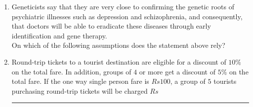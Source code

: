 \documentclass[journal]{IEEEtran}
\begin{document}
\begin{enumerate}
\begin{enumerate}
\end{enumerate}
\item Geneticists say that they are very close to confirming the genetic roots of psychiatric illnesses such as depression and schizophrenia, and consequently, that doctors will be able to eradicate these diseases through early identification and gene therapy.\\
On which of the following assumptions does the statement above rely?
	\begin{enumerate}
\end{enumerate}
\item Round-trip tickets to a tourist destination are eligible for a discount of $10\%$ on the total fare. In addition, groups of $4$ or more get a discount of $5\%$ on the total fare. If the one way single person fare is $Rs 100$, a group of $5$ tourists purchasing round-trip tickets will be charged $Rs$ \rule{2cm}{0.2pt}


\end{enumerate}
\end{document}
